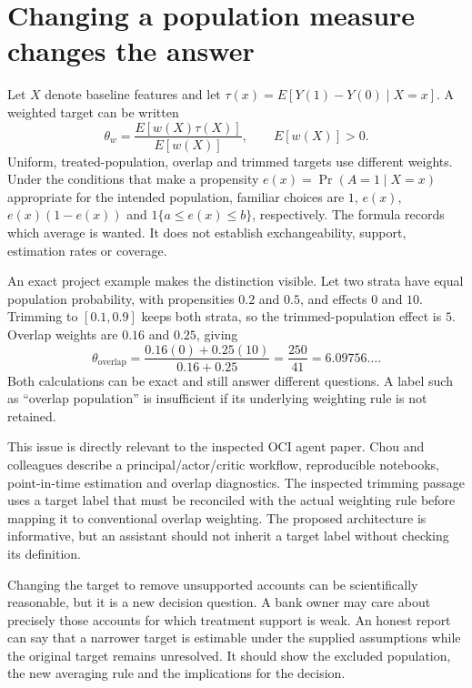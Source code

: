 \section{Changing a population measure changes the answer}

Let \(X\) denote baseline features and let
\(\tau(x)=E[Y(1)-Y(0)\mid X=x]\). A weighted target can be written
\begin{equation}
 \theta_w=\frac{E[w(X)\tau(X)]}{E[w(X)]},\qquad E[w(X)]>0.
 \label{la:weighted-target}
\end{equation}
Uniform, treated-population, overlap and trimmed targets use different
weights. Under the conditions that make a propensity \(e(x)=\Pr(A=1\mid X=x)\)
appropriate for the intended population, familiar choices are \(1\),
\(e(x)\), \(e(x)(1-e(x))\) and
\(1\{a\leq e(x)\leq b\}\), respectively. The formula records which average
is wanted. It does not establish exchangeability, support, estimation rates
or coverage.

An exact project example makes the distinction visible. Let two strata have
equal population probability, with propensities \(0.2\) and \(0.5\), and
effects \(0\) and \(10\). Trimming to \([0.1,0.9]\) keeps both strata, so
the trimmed-population effect is \(5\). Overlap weights are \(0.16\) and
\(0.25\), giving
\[
 \theta_{\mathrm{overlap}}=
 \frac{0.16(0)+0.25(10)}{0.16+0.25}=\frac{250}{41}
 =6.09756\ldots.
\]
Both calculations can be exact and still answer different questions. A label
such as ``overlap population'' is insufficient if its underlying weighting
rule is not retained.

This issue is directly relevant to the inspected OCI agent paper. Chou and
colleagues describe a principal/actor/critic workflow, reproducible notebooks,
point-in-time estimation and overlap diagnostics. The inspected trimming
passage uses a target label that must be reconciled with the actual weighting
rule before mapping it to conventional overlap weighting. The proposed
architecture is informative, but an assistant should not inherit a target
label without checking its definition. \cite{v12_la_2607_22443}

Changing the target to remove unsupported accounts can be scientifically
reasonable, but it is a new decision question. A bank owner may care about
precisely those accounts for which treatment support is weak. An honest report
can say that a narrower target is estimable under the supplied assumptions
while the original target remains unresolved. It should show the excluded
population, the new averaging rule and the implications for the decision.

